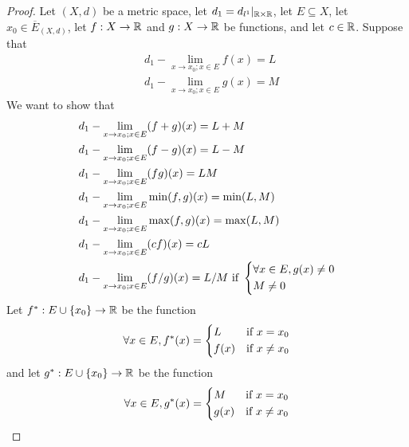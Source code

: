 \begin{proof}
  Let \((X, d)\) be a metric space, let \(d_1 = d_{l^1}|_{\mathbb{R} \times \mathbb{R}}\), let \(E \subseteq X\), let \(x_0 \in \overline{E}_{(X, d)}\), let \(f : X \to \mathbb{R}\) and \(g : X \to \mathbb{R}\) be functions, and let \(c \in \mathbb{R}\).
  Suppose that
  \begin{align*}
     & d_1 - \lim_{x \to x_0 ; x \in E} f(x) = L \\
     & d_1 - \lim_{x \to x_0 ; x \in E} g(x) = M
  \end{align*}
  We want to show that
  \begin{align*}
     & d_1 - \lim_{x \to x_0 ; x \in E} (f + g)(x) = L + M                                          \\
     & d_1 - \lim_{x \to x_0 ; x \in E} (f - g)(x) = L - M                                          \\
     & d_1 - \lim_{x \to x_0 ; x \in E} (fg)(x) = LM                                                \\
     & d_1 - \lim_{x \to x_0 ; x \in E} \min(f, g)(x) = \min(L, M)                                  \\
     & d_1 - \lim_{x \to x_0 ; x \in E} \max(f, g)(x) = \max(L, M)                                  \\
     & d_1 - \lim_{x \to x_0 ; x \in E} (cf)(x) = cL                                                \\
     & d_1 - \lim_{x \to x_0 ; x \in E} (f / g)(x) = L / M \text{ if } \begin{dcases}
                                                                         \forall x \in E, g(x) \neq 0 \\
                                                                         M \neq 0
                                                                       \end{dcases}
  \end{align*}
  Let \(f^* : E \cup \left\lbrace x_0\right\rbrace \to \mathbb{R}\) be the function
  \[
    \forall x \in E, f^*(x) = \begin{dcases}
      L    & \text{if } x = x_0    \\
      f(x) & \text{if } x \neq x_0
    \end{dcases}
  \]
  and let \(g^* : E \cup \left\lbrace x_0\right\rbrace \to \mathbb{R}\) be the function
  \[
    \forall x \in E, g^*(x) = \begin{dcases}
      M    & \text{if } x = x_0    \\
      g(x) & \text{if } x \neq x_0
    \end{dcases}
\]
\end{proof}
